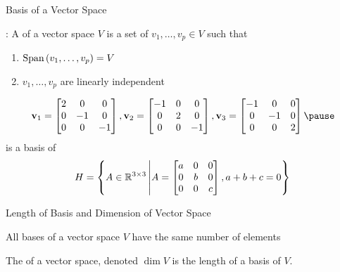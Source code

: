 \documentclass[xcoler=dvipsnames, aspectratio=169]{beamer}
\begin{document}
    \begin{frame}{Basis of a Vector Space}
        \begin{defn}
            : A  of a vector space $V$ is a set of $v_1,\dots,v_p\in V$
            such that
            \begin{enumerate}
                \pause\item $\text{Span}\left(v_1,\dots,v_p\right) = V$ 
                \pause\item $v_1,\dots,v_p$ are linearly independent
            \end{enumerate}
        \end{defn}
        \pause
        \begin{example}
            \[
            \vec{v}_1 = \begin{bmatrix}
                2 & 0 & 0\\
                0 &-1 & 0\\
                0 & 0 &-1
            \end{bmatrix}, \vec{v}_2 = \begin{bmatrix}
               -1 & 0 & 0\\
                0 & 2 & 0\\
                0 & 0 &-1
            \end{bmatrix}, \vec{v}_3 = \begin{bmatrix}
               -1 & 0 & 0\\
                0 &-1 & 0\\
                0 & 0 & 2
            \end{bmatrix}\pause
            \]
            is a basis of
            \[
                H = \left\{A\in\mathbb{R}^{3\times 3}\left|A = \begin{bmatrix}
                    a & 0 & 0\\
                    0 & b & 0\\
                    0 & 0 & c
                \end{bmatrix}, a+b+c=0\right\}\right.
            \]
        \end{example}
    \end{frame}
    \begin{frame}{Length of Basis and Dimension of Vector Space}
        \begin{theorem}
            All bases of a vector space $V$ have the same number of elements
        \end{theorem}
        \vspace{100pt}
        \pause
        \begin{defn}
            The  of a vector space, denoted $\dim{V}$ is the length of a basis
            of $V$.
        \end{defn}
    \end{frame}
\end{document}
